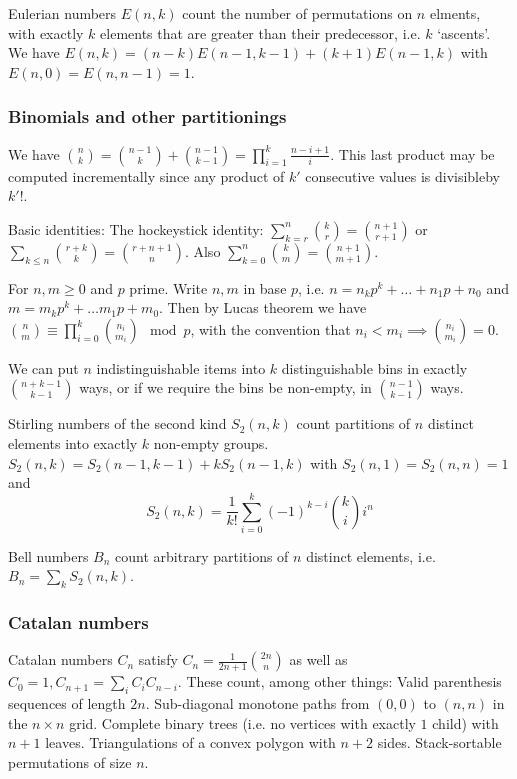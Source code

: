 \documentclass[
	a4paper,
	landscape,
	10pt,
	article
]{article}
\begin{document}
Eulerian numbers $E(n, k)$ count the number of permutations on $n$ elments,
with exactly $k$ elements that are greater than their predecessor, i.e.
$k$ `ascents'. We have $E(n, k) = (n-k)E(n-1,k-1)+(k+1)E(n-1,k)$ with
$E(n, 0) = E(n, n-1)=1$.

\subsubsection*{Binomials and other partitionings}
We have $\binom{n}{k} = \binom{n-1}{k}+\binom{n-1}{k-1} =
	\prod_{i=1}^k \frac{n-i+1}{i}$. This last product may be computed
incrementally since any product of $k'$ consecutive values is divisibleby
$k'!$.

Basic identities: The hockeystick identity: $\sum_{k=r}^n \binom{k}{r}
	= \binom{n+1}{r+1}$
or $\sum_{k\leq n}\binom{r+k}{k} = \binom{r+n+1}{n}$.
Also $\sum_{k=0}^n \binom{k}{m} = \binom{n+1}{m+1}$.

For $n, m \geq 0$ and $p$ prime. Write $n, m$ in base $p$, i.e.
$n = n_k p^k + \dots + n_1 p + n_0$ and $m = m_k p^k + \dots m_1 p + m_0$. Then
by Lucas theorem we have $\binom{n}{m} \equiv \prod_{i=0}^k \binom{n_i}{m_i}
	\mod p$, with the convention that $n_i < m_i \implies \binom{n_i}{m_i} =0$.



We can put $n$ indistinguishable items into $k$ distinguishable bins in exactly
$\binom{n+k-1}{k-1}$ ways, or if we require the bins be non-empty, in
$\binom{n-1}{k-1}$ ways.

Stirling numbers of the second kind $S_2(n, k)$ count partitions of $n$
distinct elements into exactly $k$ non-empty groups.
$S_2(n, k) = S_2(n-1, k-1) + kS_2(n-1, k)$ with $S_2(n, 1) = S_2(n, n) = 1$ and
$$S_2(n, k) = \frac{1}{k!}\sum_{i=0}^k (-1)^{k-i}\binom{k}{i}i^n$$

Bell numbers $B_n$ count arbitrary partitions of $n$ distinct elements, i.e.
$B_n = \sum_k S_2(n, k)$.

\subsubsection*{Catalan numbers}
Catalan numbers $C_n$ satisfy $C_n = \frac{1}{2n+1}\binom{2n}{n}$ as well
as $C_0 = 1, C_{n+1} = \sum_i C_i C_{n-i}$. These count, among other things:
	Valid parenthesis sequences of length $2n$.
	Sub-diagonal monotone paths from $(0, 0)$ to $(n, n)$ in the
		$n\times n$ grid.
	Complete binary trees (i.e. no vertices with exactly $1$ child)
		with $n+1$ leaves.
	Triangulations of a convex polygon with $n+2$ sides.
	Stack-sortable permutations of size $n$.
\end{document}
